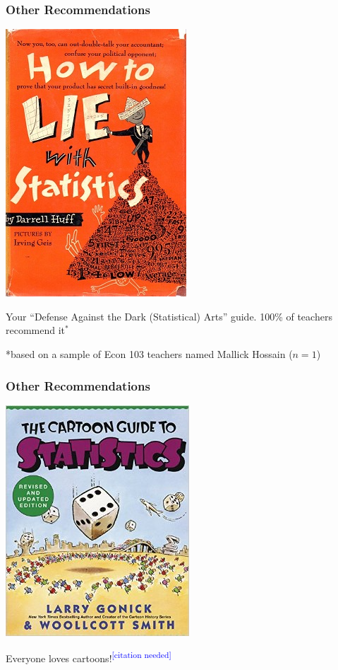 \documentclass{beamer}
\begin{document}
\begin{frame}
\frametitle{Other Recommendations}
	\begin{center}
		\includegraphics[scale=0.5]{./images/How_to_Lie_with_Statistics.jpg}
	\end{center}
	\begin{center}
	Your ``Defense Against the Dark (Statistical) Arts'' guide. 100\% of teachers recommend it$^*$
	\end{center}
	\tiny{*based on a sample of Econ 103 teachers named Mallick Hossain ($n = 1$)}
\end{frame}

\begin{frame}
\frametitle{Other Recommendations}
	\begin{center}
		\includegraphics[scale=0.5]{./images/cartoon_stats.jpg}
	\end{center}
	\centering
	Everyone loves cartoons!\textsuperscript{\textcolor{blue}{[citation needed]}}
\end{frame}
\end{document}

